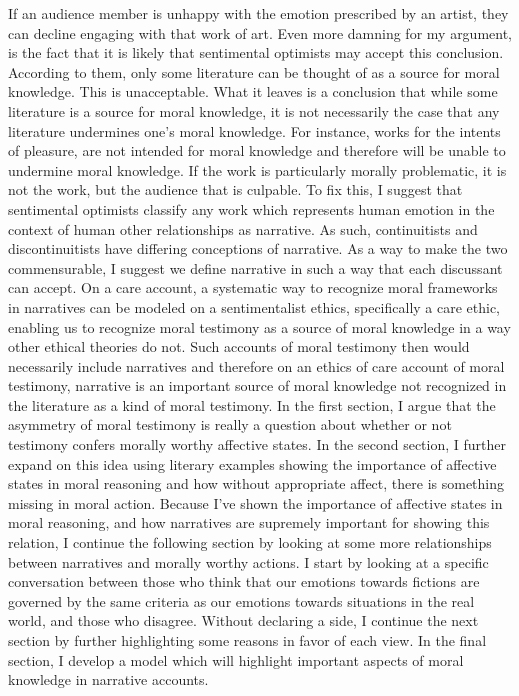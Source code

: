 \documentclass[
  letterpaper,
  DIV=11,
  numbers=noendperiod]{scrartcl}
\theoremstyle{remark}
\begin{document}
If an audience member is unhappy with the emotion prescribed by an
artist, they can decline engaging with that work of art. Even more
damning for my argument, is the fact that it is likely that sentimental
optimists may accept this conclusion. According to them, only some
literature can be thought of as a source for moral knowledge. This is
unacceptable. What it leaves is a conclusion that while some literature
is a source for moral knowledge, it is not necessarily the case that any
literature undermines one's moral knowledge. For instance, works for the
intents of pleasure, are not intended for moral knowledge and therefore
will be unable to undermine moral knowledge. If the work is particularly
morally problematic, it is not the work, but the audience that is
culpable. To fix this, I suggest that sentimental optimists classify any
work which represents human emotion in the context of human other
relationships as narrative. As such, continuitists and discontinuitists
have differing conceptions of narrative. As a way to make the two
commensurable, I suggest we define narrative in such a way that each
discussant can accept. On a care account, a systematic way to recognize
moral frameworks in narratives can be modeled on a sentimentalist
ethics, specifically a care ethic, enabling us to recognize moral
testimony as a source of moral knowledge in a way other ethical theories
do not. Such accounts of moral testimony then would necessarily include
narratives and therefore on an ethics of care account of moral
testimony, narrative is an important source of moral knowledge not
recognized in the literature as a kind of moral testimony. In the first
section, I argue that the asymmetry of moral testimony is really a
question about whether or not testimony confers morally worthy affective
states. In the second section, I further expand on this idea using
literary examples showing the importance of affective states in moral
reasoning and how without appropriate affect, there is something missing
in moral action. Because I've shown the importance of affective states
in moral reasoning, and how narratives are supremely important for
showing this relation, I continue the following section by looking at
some more relationships between narratives and morally worthy actions. I
start by looking at a specific conversation between those who think that
our emotions towards fictions are governed by the same criteria as our
emotions towards situations in the real world, and those who disagree.
Without declaring a side, I continue the next section by further
highlighting some reasons in favor of each view. In the final section, I
develop a model which will highlight important aspects of moral
knowledge in narrative accounts.
\end{document}
